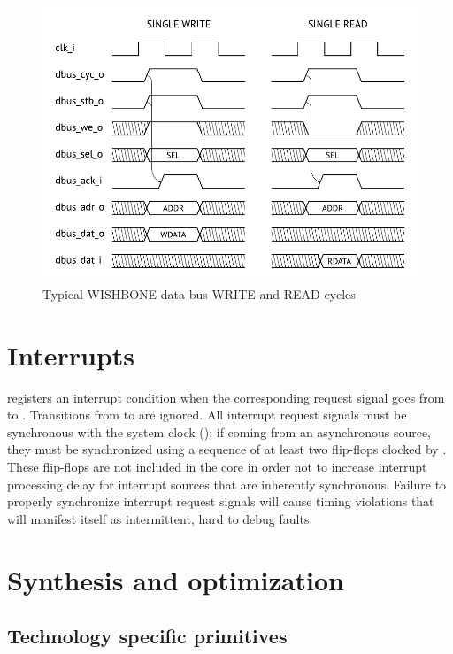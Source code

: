 \documentclass[a4paper,12pt,twoside,extrafontsizes]{memoir}
\begin{document}
\begin{figure}[htbp]
	\centering
	\includegraphics[scale=0.928]{images/dbustiming.pdf}
	\caption{Typical WISHBONE data bus WRITE and READ cycles}
	\label{fig:dbustiming}
\end{figure}

\section{Interrupts}

\lxp{} registers an interrupt condition when the corresponding request signal goes from  to . Transitions from  to  are ignored. All interrupt request signals must be synchronous with the system clock (); if coming from an asynchronous source, they must be synchronized using a sequence of at least two flip-flops clocked by . These flip-flops are not included in the \lxp{} core in order not to increase interrupt processing delay for interrupt sources that are inherently synchronous. Failure to properly synchronize interrupt request signals will cause timing violations that will manifest itself as intermittent, hard to debug faults.

\section{Synthesis and optimization}
\label{sec:synthesis}

\subsection{Technology specific primitives}
\end{document}
